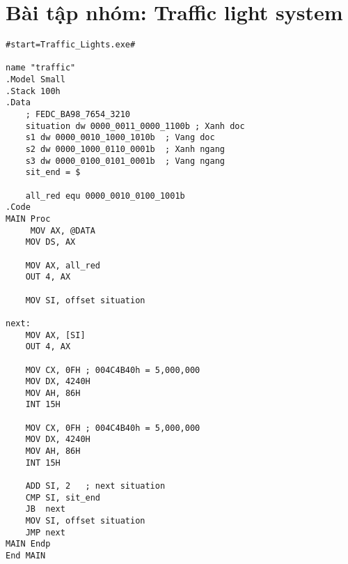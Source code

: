 \documentclass{article}
\begin{document}
\newpage
\section{Bài tập nhóm: Traffic light system}

\begin{lstlisting}[caption={Traffic light system}]
#start=Traffic_Lights.exe#

name "traffic"
.Model Small
.Stack 100h
.Data
    ; FEDC_BA98_7654_3210
    situation dw 0000_0011_0000_1100b ; Xanh doc  
    s1 dw 0000_0010_1000_1010b  ; Vang doc
    s2 dw 0000_1000_0110_0001b  ; Xanh ngang
    s3 dw 0000_0100_0101_0001b  ; Vang ngang
    sit_end = $

    all_red equ 0000_0010_0100_1001b
.Code
MAIN Proc
     MOV AX, @DATA
    MOV DS, AX
    
    MOV AX, all_red
    OUT 4, AX
    
    MOV SI, offset situation

next:
    MOV AX, [SI]
    OUT 4, AX

    MOV CX, 0FH ; 004C4B40h = 5,000,000
    MOV DX, 4240H
    MOV AH, 86H
    INT 15H   
    
    MOV CX, 0FH ; 004C4B40h = 5,000,000
    MOV DX, 4240H
    MOV AH, 86H
    INT 15H
    
    ADD SI, 2   ; next situation
    CMP SI, sit_end
    JB  next
    MOV SI, offset situation
    JMP next
MAIN Endp
End MAIN
\end{lstlisting}
\end{document}
